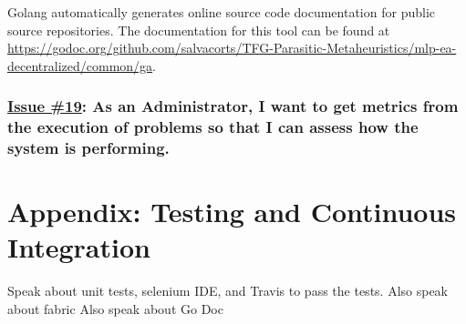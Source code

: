 Golang automatically generates online source code documentation for public source repositories. The documentation for this tool can be found at \href{godoc.org/github.com/salvacorts/TFG-Parasitic-Metaheuristics/mlp-ea-decentralized/common/ga}{https://godoc.org/github.com/salvacorts/TFG-Parasitic-Metaheuristics/mlp-ea-decentralized/common/ga}.


\subsubsection*{\href{https://github.com/salvacorts/TFG-Parasitic-Metaheuristics/issues/19}{Issue \#19}: As an Administrator, I want to get metrics from the execution of problems so that I can assess how the system is performing.}



\section{Appendix: Testing and Continuous Integration}

Speak about unit tests, selenium IDE, and Travis to pass the tests. Also speak about fabric
Also speak about Go Doc